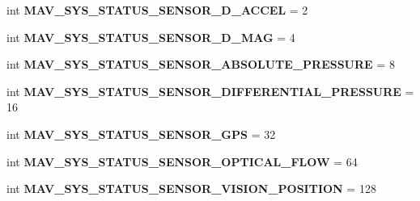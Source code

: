 \begin{DoxyCompactItemize}
\mbox{\label{namespacepymavlink_1_1dialects_1_1v10_a002fa09ed961f9e1b5d575845f96307d}} 
int {\bfseries M\+A\+V\+\_\+\+S\+Y\+S\+\_\+\+S\+T\+A\+T\+U\+S\+\_\+\+S\+E\+N\+S\+O\+R\+\_\+D\+\_\+\+A\+C\+C\+EL} = 2
\item 
\mbox{\label{namespacepymavlink_1_1dialects_1_1v10_add5ddc45c208c5caa8a801f23ea3d444}} 
int {\bfseries M\+A\+V\+\_\+\+S\+Y\+S\+\_\+\+S\+T\+A\+T\+U\+S\+\_\+\+S\+E\+N\+S\+O\+R\+\_\+D\+\_\+\+M\+AG} = 4
\item 
\mbox{\label{namespacepymavlink_1_1dialects_1_1v10_a30759b59b3651a2f4ec3f0885dcb23f7}} 
int {\bfseries M\+A\+V\+\_\+\+S\+Y\+S\+\_\+\+S\+T\+A\+T\+U\+S\+\_\+\+S\+E\+N\+S\+O\+R\+\_\+\+A\+B\+S\+O\+L\+U\+T\+E\+\_\+\+P\+R\+E\+S\+S\+U\+RE} = 8
\item 
\mbox{\label{namespacepymavlink_1_1dialects_1_1v10_a72888415fde1bd6106009fbfb0d29271}} 
int {\bfseries M\+A\+V\+\_\+\+S\+Y\+S\+\_\+\+S\+T\+A\+T\+U\+S\+\_\+\+S\+E\+N\+S\+O\+R\+\_\+\+D\+I\+F\+F\+E\+R\+E\+N\+T\+I\+A\+L\+\_\+\+P\+R\+E\+S\+S\+U\+RE} = 16
\item 
\mbox{\label{namespacepymavlink_1_1dialects_1_1v10_aaa5017fd02eb154f61bd364785a2986a}} 
int {\bfseries M\+A\+V\+\_\+\+S\+Y\+S\+\_\+\+S\+T\+A\+T\+U\+S\+\_\+\+S\+E\+N\+S\+O\+R\+\_\+\+G\+PS} = 32
\item 
\mbox{\label{namespacepymavlink_1_1dialects_1_1v10_a32ed72c8bdfbec339722be191daf1a40}} 
int {\bfseries M\+A\+V\+\_\+\+S\+Y\+S\+\_\+\+S\+T\+A\+T\+U\+S\+\_\+\+S\+E\+N\+S\+O\+R\+\_\+\+O\+P\+T\+I\+C\+A\+L\+\_\+\+F\+L\+OW} = 64
\item 
\mbox{\label{namespacepymavlink_1_1dialects_1_1v10_ac8a57b7f2d2935313de5c13941cbee4f}} 
int {\bfseries M\+A\+V\+\_\+\+S\+Y\+S\+\_\+\+S\+T\+A\+T\+U\+S\+\_\+\+S\+E\+N\+S\+O\+R\+\_\+\+V\+I\+S\+I\+O\+N\+\_\+\+P\+O\+S\+I\+T\+I\+ON} = 128
\item 
\mbox{\label{namespacepymavlink_1_1dialects_1_1v10_a8d1547f248ac2e497ade3ccf2dec5cb3}} 

\end{DoxyCompactItemize}
